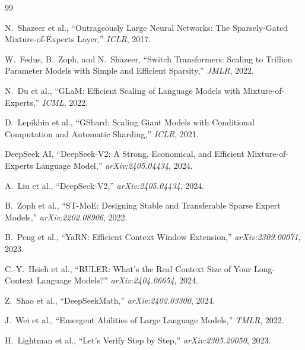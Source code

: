 \documentclass[11pt,a4paper]{article}
\begin{document}
\begin{thebibliography}{99}

N.~Shazeer et al., ``Outrageously Large Neural Networks: The Sparsely-Gated Mixture-of-Experts
Layer,'' \textit{ICLR}, 2017.

W.~Fedus, B.~Zoph, and N.~Shazeer, ``Switch Transformers: Scaling to Trillion Parameter Models
with Simple and Efficient Sparsity,'' \textit{JMLR}, 2022.

N.~Du et al., ``GLaM: Efficient Scaling of Language Models with Mixture-of-Experts,''
\textit{ICML}, 2022.

D.~Lepikhin et al., ``GShard: Scaling Giant Models with Conditional Computation and Automatic
Sharding,'' \textit{ICLR}, 2021.

DeepSeek AI, ``DeepSeek-V2: A Strong, Economical, and Efficient Mixture-of-Experts Language
Model,'' \textit{arXiv:2405.04434}, 2024.

A.~Liu et al., ``DeepSeek-V2,'' \textit{arXiv:2405.04434}, 2024.

B.~Zoph et al., ``ST-MoE: Designing Stable and Transferable Sparse Expert Models,''
\textit{arXiv:2202.08906}, 2022.

B.~Peng et al., ``YaRN: Efficient Context Window Extension,'' \textit{arXiv:2309.00071}, 2023.

C.-Y.~Hsieh et al., ``RULER: What's the Real Context Size of Your Long-Context Language Models?''
\textit{arXiv:2404.06654}, 2024.

Z.~Shao et al., ``DeepSeekMath,'' \textit{arXiv:2402.03300}, 2024.

J.~Wei et al., ``Emergent Abilities of Large Language Models,'' \textit{TMLR}, 2022.

H.~Lightman et al., ``Let's Verify Step by Step,'' \textit{arXiv:2305.20050}, 2023.

\end{thebibliography}
\end{document}
